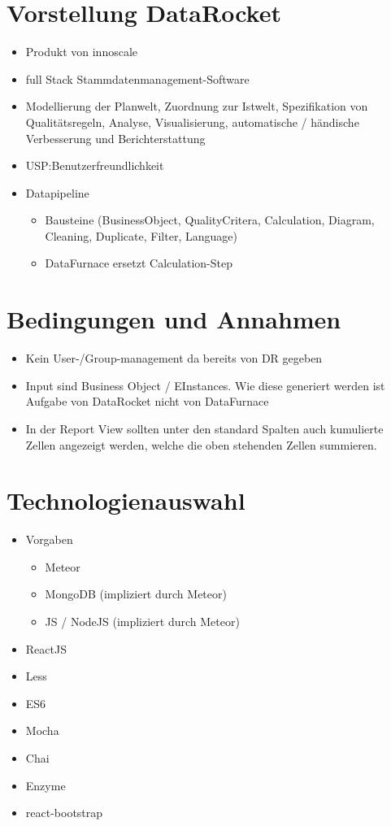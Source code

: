 \documentclass[
  language=german, %
  type=bachelor%
]{isthesis}
\begin{document}
\begin{content}
  \section{Vorstellung DataRocket}
\label{sec:Vorstellung-DataRocket}
  \begin{itemize}
    \item Produkt von innoscale
    \item full Stack Stammdatenmanagement-Software
    \item Modellierung der Planwelt, Zuordnung zur Istwelt, Spezifikation von
      Qualitätsregeln, Analyse, Visualisierung, automatische / händische
      Verbesserung und Berichterstattung
    \item USP:\@ Benutzerfreundlichkeit 
    \item Datapipeline
      \begin{itemize}
        \item Bausteine (BusinessObject, QualityCritera, Calculation, Diagram,
          Cleaning, Duplicate, Filter, Language)
        \item DataFurnace ersetzt Calculation-Step
      \end{itemize}
  \end{itemize}

  \section{Bedingungen und Annahmen}
  \begin{itemize}
    \item Kein User-/Group-management da bereits von DR gegeben
    \item Input sind Business Object / EInstances. Wie diese generiert werden
      ist Aufgabe von DataRocket nicht von DataFurnace
    \item In der Report View sollten unter den standard Spalten auch kumulierte
      Zellen angezeigt werden, welche die oben stehenden Zellen summieren.
  \end{itemize}

  \section{Technologienauswahl}
  \begin{itemize}
    \item Vorgaben
      \begin{itemize}
        \item Meteor
        \item MongoDB (impliziert durch Meteor)
        \item JS / NodeJS (impliziert durch Meteor)
      \end{itemize}
    \item ReactJS
    \item Less
    \item ES6
    \item Mocha
    \item Chai
    \item Enzyme
    \item react-bootstrap
  \end{itemize}


\end{content}
\end{document}

